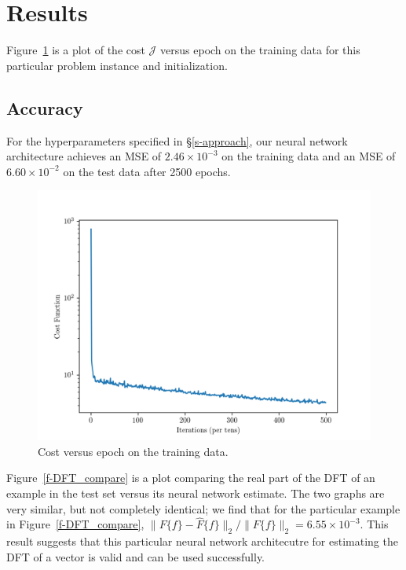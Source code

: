 \documentclass[12pt]{article}
\begin{document}
\section{Results} 
Figure~\ref{f-example_cost_vs_epoch} is a plot of the cost $\mathcal J$ versus epoch on the training 
data for this particular problem instance and initialization.

\subsection{Accuracy} For the hyperparameters specified in \S\ref{s-approach}, our neural network architecture achieves 
an MSE of $2.46 \times 10^{-3}$ on the training data and an MSE of $6.60 \times 10^{-2}$ on the test data after 2500 
epochs.

\begin{figure}
\centering
\includegraphics[scale=.75]{figures/final_cost_vs_epoch.png}
\caption{Cost versus epoch on the training data.}
\label{f-example_cost_vs_epoch}
\end{figure}

Figure~\ref{f-DFT_compare} is a plot comparing the real part of the DFT of an example in the test set 
versus its neural network estimate. The two graphs are very similar, but not completely identical; we 
find that for the particular example in Figure~\ref{f-DFT_compare}, 
$\|F\{f\} - \hat{F}\{f\}\|_2 / \|F\{f\}\|_2 = 6.55 \times 10^{-3}$. This result suggests that this particular
neural network architecutre for estimating the DFT of a vector is valid and can be used successfully.
\end{document}
